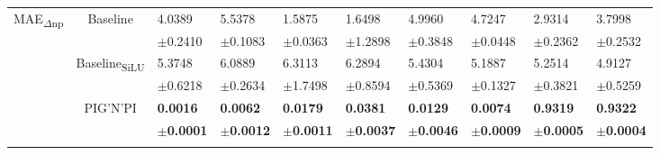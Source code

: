 \documentclass{article}
\newcommand{\pignpi}{PIG'N'PI\xspace}
\begin{document}
\begin{table}[h!]
{\begin{tabularx}{\textwidth}{ccXXXXXXXX}
        \multirow{6}{*}{\textsf{MAE\textsubscript{$\Delta$np}}} 
        &\multirow{2}{*}{Baseline}
        & 4.0389 & 5.5378 & 1.5875 & 1.6498 & 4.9960 & 4.7247 & 2.9314 & 3.7998 \\
        &&\scriptsize$\pm$0.2410 & \scriptsize $\pm$0.1083 & \scriptsize $\pm$0.0363 & \scriptsize $\pm$1.2898 & \scriptsize $\pm$0.3848 & \scriptsize $\pm$0.0448 & \scriptsize $\pm$0.2362 & \scriptsize $\pm$0.2532\\
        \cline{3-10}\rule{0pt}{2.3ex}
        &\multirow{2}{*}{{Baseline\textsubscript{SiLU}}}
        & 5.3748 & 6.0889 & 6.3113 & 6.2894 & 5.4304 & 5.1887 & 5.2514 & 4.9127 \\
        &&\scriptsize$\pm$0.6218 & \scriptsize $\pm$0.2634 & \scriptsize $\pm$1.7498 & \scriptsize $\pm$0.8594 & \scriptsize $\pm$0.5369 & \scriptsize $\pm$0.1327 & \scriptsize $\pm$0.3821 & \scriptsize $\pm$0.5259\\
        \cline{3-10}\rule{0pt}{2.3ex}
        &\multirow{2}{*}{\pignpi}
        & \textbf{0.0016} & \textbf{0.0062} & \textbf{0.0179} & \textbf{0.0381} & \textbf{0.0129} & \textbf{0.0074} & \textbf{0.9319} & \textbf{0.9322} \\
        && \scriptsize \textbf{$\pm$0.0001} & \scriptsize \textbf{$\pm$0.0012} & \scriptsize \textbf{$\pm$0.0011} & \scriptsize \textbf{$\pm$0.0037} & \scriptsize \textbf{$\pm$0.0046} & \scriptsize \textbf{$\pm$0.0009} & \scriptsize \textbf{$\pm$0.0005} & \scriptsize \textbf{$\pm$0.0004}\\
        \hline\rule{0pt}{2.3ex}
        

\end{tabularx}}
\end{table}
\end{document}
